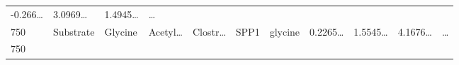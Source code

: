 \documentclass[
]{article}
\begin{document}
\begin{longtable}[]{@{}lllllllllll@{}}
\begin{minipage}[t]{0.07\columnwidth}
-0.266\ldots{}\strut
\end{minipage} & \begin{minipage}[t]{0.07\columnwidth}\raggedright
3.0969\ldots{}\strut
\end{minipage} & \begin{minipage}[t]{0.07\columnwidth}\raggedright
1.4945\ldots{}\strut
\end{minipage} & \begin{minipage}[t]{0.03\columnwidth}\raggedright
\ldots{}\strut
\end{minipage}\tabularnewline
\begin{minipage}[t]{0.03\columnwidth}\raggedright
750\strut
\end{minipage} & \begin{minipage}[t]{0.07\columnwidth}\raggedright
Substrate\strut
\end{minipage} & \begin{minipage}[t]{0.07\columnwidth}\raggedright
Glycine\strut
\end{minipage} & \begin{minipage}[t]{0.09\columnwidth}\raggedright
Acetyl\ldots{}\strut
\end{minipage} & \begin{minipage}[t]{0.07\columnwidth}\raggedright
Clostr\ldots{}\strut
\end{minipage} & \begin{minipage}[t]{0.07\columnwidth}\raggedright
SPP1\strut
\end{minipage} & \begin{minipage}[t]{0.09\columnwidth}\raggedright
glycine\strut
\end{minipage} & \begin{minipage}[t]{0.07\columnwidth}\raggedright
0.2265\ldots{}\strut
\end{minipage} & \begin{minipage}[t]{0.07\columnwidth}\raggedright
1.5545\ldots{}\strut
\end{minipage} & \begin{minipage}[t]{0.07\columnwidth}\raggedright
4.1676\ldots{}\strut
\end{minipage} & \begin{minipage}[t]{0.03\columnwidth}\raggedright
\ldots{}\strut
\end{minipage}\tabularnewline
\begin{minipage}[t]{0.03\columnwidth}\raggedright
750\strut
\end{minipage} & \begin{minipage}[t]{0.07\columnwidth}\raggedright

\end{minipage}
\end{longtable}
\end{document}
